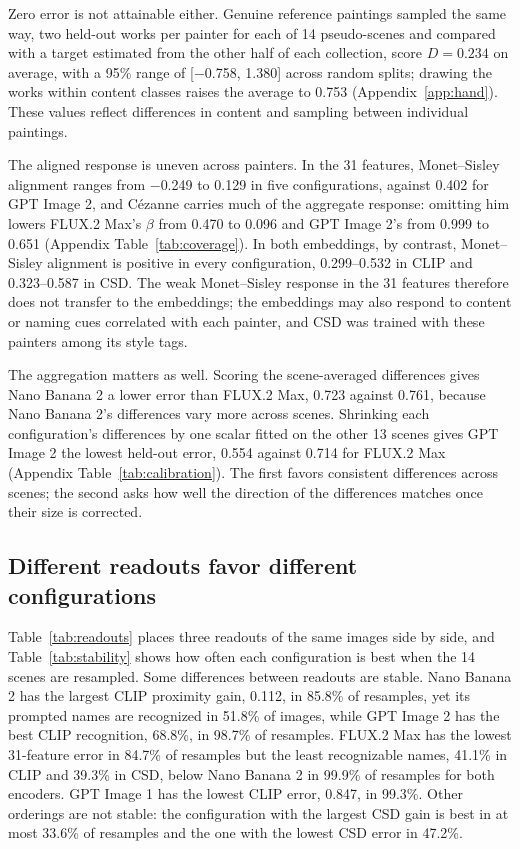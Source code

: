\documentclass[10pt]{article}
\begin{document}
Zero error is not attainable either. Genuine reference paintings sampled the same way, two
held-out works per painter for each of 14 pseudo-scenes and compared with a target estimated
from the other half of each collection, score $D=0.234$ on average, with a 95\% range of
[$-$0.758, 1.380] across random splits; drawing the works within content classes raises the
average to 0.753 (Appendix~\ref{app:hand}). These values reflect differences in content and
sampling between individual paintings.

The aligned response is uneven across painters. In the 31 features, Monet--Sisley alignment
ranges from $-$0.249 to 0.129 in five configurations, against 0.402 for GPT Image 2, and
C\'ezanne carries much of the aggregate response: omitting him lowers FLUX.2 Max's $\beta$
from 0.470 to 0.096 and GPT Image 2's from 0.999 to 0.651 (Appendix Table~\ref{tab:coverage}).
In both embeddings, by contrast, Monet--Sisley alignment is positive in every configuration,
0.299--0.532 in CLIP and 0.323--0.587 in CSD. The weak Monet--Sisley response in the 31
features therefore does not transfer to the embeddings; the embeddings may also respond to
content or naming cues correlated with each painter, and CSD was trained with these painters
among its style tags.

The aggregation matters as well. Scoring the scene-averaged differences gives Nano Banana 2 a
lower error than FLUX.2 Max, 0.723 against 0.761, because Nano Banana 2's differences vary
more across scenes. Shrinking each configuration's differences by one scalar fitted on the
other 13 scenes gives GPT Image 2 the lowest held-out error, 0.554 against 0.714 for FLUX.2
Max (Appendix Table~\ref{tab:calibration}). The first favors consistent differences across
scenes; the second asks how well the direction of the differences matches once their size is
corrected.

\subsection{Different readouts favor different configurations}\label{sec:readouts}




Table~\ref{tab:readouts} places three readouts of the same images side by side, and
Table~\ref{tab:stability} shows how often each configuration is best when the 14 scenes are
resampled. Some differences between readouts are stable. Nano Banana 2 has the largest CLIP
proximity gain, 0.112, in 85.8\% of resamples, yet its prompted names are recognized in 51.8\%
of images, while GPT Image 2 has the best CLIP recognition, 68.8\%, in 98.7\% of resamples.
FLUX.2 Max has the lowest 31-feature error in 84.7\% of resamples but the least recognizable
names, 41.1\% in CLIP and 39.3\% in CSD, below Nano Banana 2 in 99.9\% of resamples for both
encoders. GPT Image 1 has the lowest CLIP error, 0.847, in 99.3\%. Other orderings are not
stable: the configuration with the largest CSD gain is best in at most 33.6\% of resamples and
the one with the lowest CSD error in 47.2\%.
\end{document}
